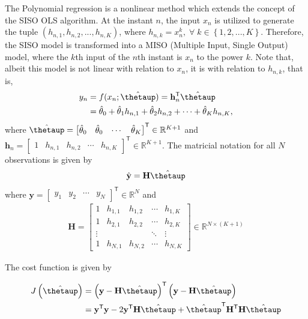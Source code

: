 \documentclass[english]{sobraep}
\newcommand{\trans}{\mathsf{T}}
\begin{document}
The Polynomial regression is a nonlinear method which extends the concept of the SISO OLS algorithm. At the instant \(n\), the input \(x_n\) is utilized to generate the tuple \(\left( h_{n,1}, h_{n,2}, ..., h_{n,K} \right)\), where \(h_{n,k}=x_n^k,\;\forall\; k \in \left\{ 1, 2, ..., K \right\}\). Therefore, the SISO model is transformed into a MISO (Multiple Input, Single Output) model, where the \(k\)th input of the \(n\)th instant is \(x_n\) to the power \(k\). Note that, albeit this model is not linear with relation to \(x_n\), it is with relation to \(h_{n,k}\), that is,
\begin{align}
    y_n & = f(x_n;\hat{\boldsymbol{\thetaup}}) = \mathbf{h}_n^\trans \hat{\boldsymbol{\thetaup}} \nonumber \\
    & = \hat{\theta}_0 + \hat{\theta}_1 h_{n,1} + \hat{\theta}_2 h_{n,2}  + \cdots + \hat{\theta}_K h_{n,K},
\end{align}
where \(\hat{\boldsymbol{\thetaup}} = \begin{bmatrix}
    \hat{\theta}_0 & \hat{\theta}_0 & \cdots & \hat{\theta}_K
\end{bmatrix}^\trans \in \mathbb{R}^{K+1}\) and \(\mathbf{h}_n = \begin{bmatrix}
    1 & h_{n,1} & h_{n,2} & \cdots & h_{n,K}
\end{bmatrix}^\trans  \in \mathbb{R}^{K+1}\). The matricial notation for all \(N\) observations is given by
\begin{align}
    \hat{\mathbf{y}} = \mathbf{H} \hat{\boldsymbol{\thetaup}}
\end{align}
where \(\mathbf{y} = \begin{bmatrix}
    y_{1} & y_{2} & \cdots & y_{N}
\end{bmatrix}^\trans  \in \mathbb{R}^{N}\) and
\begin{align}
    \mathbf{H} = \begin{bmatrix}
        1 & h_{1,1} & h_{1,2} & \cdots & h_{1,K} \\
        1 & h_{2,1} & h_{2,2} & \cdots & h_{2,K} \\
        \vdots & & & \ddots & \vdots \\
        1 & h_{N,1} & h_{N,2} & \cdots & h_{N,K}
    \end{bmatrix} \in \mathbb{R}^{N\times (K+1)}
\end{align}

The cost function is given by

\begin{align}
    J\left( \hat{\boldsymbol{\thetaup}} \right) & = \left( \mathbf{y} - \mathbf{H} \hat{\boldsymbol{\thetaup}} \right)^{\trans} \left( \mathbf{y} - \mathbf{H} \hat{\boldsymbol{\thetaup}} \right) \nonumber \\
    & = \mathbf{y}^\trans\mathbf{y} - 2\mathbf{y}^\trans \mathbf{H}\hat{\boldsymbol{\thetaup}} + \hat{\boldsymbol{\thetaup}}^\trans \mathbf{H}^\trans \mathbf{H} \hat{\boldsymbol{\thetaup}}
    \label{eq:J_MISO}
\end{align}
\end{document}
